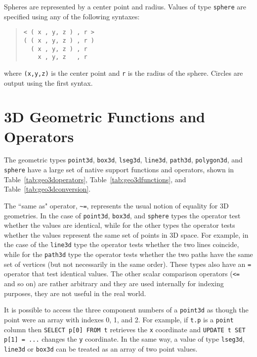 \documentclass[10pt]{article}
\begin{document}
Spheres are represented by a center point and radius. Values of type \verb+sphere+ 
are specified using any of the following syntaxes:
\begin{quote}
\begin{verbatim}
< ( x , y, z ) , r >
( ( x , y, z ) , r )
  ( x , y, z ) , r
    x , y, z   , r
\end{verbatim}
\end{quote}
where \verb+(x,y,z)+ is the center point and \verb+r+ is the radius of the sphere.
Circles are output using the first syntax.

\section{3D Geometric Functions and Operators}
\label{sec:geo3dfcts}

The geometric types \verb+point3d+, \verb+box3d+, \verb+lseg3d+, 
\verb+line3d+, \verb+path3d+, \verb+polygon3d+, and \verb+sphere+ 
have a large set of native support functions and operators, shown in 
Table~\ref{tab:geo3doperators}, Table~\ref{tab:geo3dfunctions}, and 
Table~\ref{tab:geo3dconversion}.

The ``same as" operator, \verb+~=+, represents the usual notion 
of equality for 3D geometries. In the case of 
\verb+point3d+, \verb+box3d+, and \verb+sphere+ types the operator
test whether the values are identical, while for the other types
the operator tests whether the values represent the same set of
points in 3D space. For example, in the case of the \verb+line3d+
type the operator tests whether the two lines coincide, while
for the \verb+path3d+ type the operator tests whether the two
paths have the same set of vertices (but not necessarily in the same order).
These types also have an \verb+=+ operator that test identical values. 
The other scalar comparison operators (\verb+<=+ and so on) 
are rather arbitrary and they are used internally for indexing purposes,
they are not useful in the real world.

It is possible to access the three component numbers of a \verb+point3d+ as 
though the point were an array with indexes 0, 1, and 2. 
For example, if \verb+t.p+ is a \verb+point+ column then 
\verb+SELECT p[0] FROM t+ retrieves the \verb+x+ coordinate and 
\verb+UPDATE t SET p[1] = ...+ changes the \verb+y+ coordinate. 
In the same way,  a value of type \verb+lseg3d+, \verb+line3d+ or \verb+box3d+ 
can be treated as an array of two point values.
\end{document}
